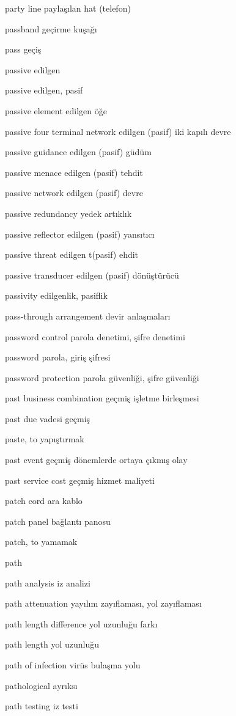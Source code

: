 \documentclass[12pt,fleqn]{article}\usepackage{../../common}
\begin{document}
party line paylaşılan hat (telefon)

passband geçirme kuşağı

pass geçiş

passive edilgen

passive edilgen, pasif

passive element edilgen öğe

passive four terminal network edilgen (pasif) iki kapılı devre

passive guidance edilgen (pasif) güdüm

passive menace edilgen (pasif) tehdit

passive network edilgen (pasif) devre

passive redundancy yedek artıklık

passive reflector edilgen (pasif) yansıtıcı

passive threat edilgen t(pasif) ehdit

passive transducer edilgen (pasif) dönüştürücü

passivity edilgenlik, pasiflik

pass-through arrangement devir anlaşmaları

password control parola denetimi, şifre denetimi

password parola, giriş şifresi

password protection parola güvenliği, şifre güvenliği

past business combination geçmiş işletme birleşmesi

past due vadesi geçmiş

paste, to yapıştırmak

past event geçmiş dönemlerde ortaya çıkmış olay

past service cost geçmiş hizmet maliyeti

patch cord ara kablo

patch panel bağlantı panosu

patch, to yamamak

path

path analysis iz analizi

path attenuation yayılım zayıflaması, yol zayıflaması

path length difference yol uzunluğu farkı

path length yol uzunluğu

path of infection virüs bulaşma yolu

pathological ayrıksı

path testing iz testi
\end{document}
